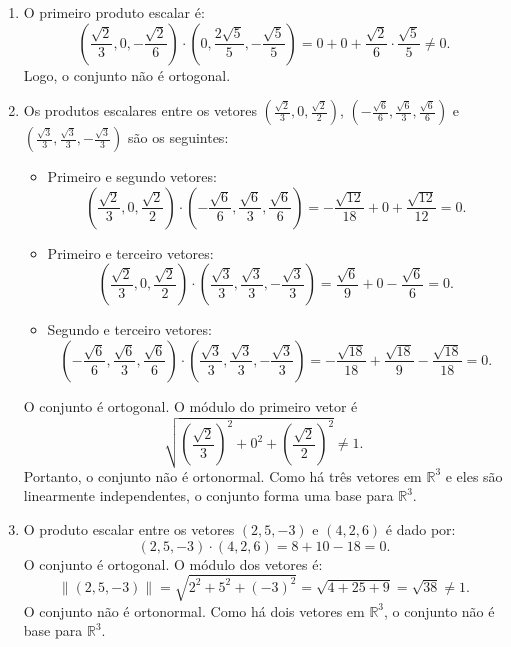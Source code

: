 \begin{resolution}
\begin{enumerate}[label=\alph*)]
    \item O primeiro produto escalar é:
          \[
            \left(\frac{\sqrt{2}}{3}, 0, -\frac{\sqrt{2}}{6}\right) \cdot \left(0, \frac{2\sqrt{5}}{5}, -\frac{\sqrt{5}}{5}\right) = 0 + 0 + \frac{\sqrt{2}}{6} \cdot \frac{\sqrt{5}}{5} \neq 0.
          \]
          Logo, o conjunto não é ortogonal.

    \item Os produtos escalares entre os vetores \(\left(\frac{\sqrt{2}}{3}, 0, \frac{\sqrt{2}}{2}\right)\), \(\left(-\frac{\sqrt{6}}{6}, \frac{\sqrt{6}}{3}, \frac{\sqrt{6}}{6}\right)\) e \(\left(\frac{\sqrt{3}}{3}, \frac{\sqrt{3}}{3}, -\frac{\sqrt{3}}{3}\right)\) são os seguintes:
          \begin{itemize}
            \item Primeiro e segundo vetores:
                  \[
                    \left(\frac{\sqrt{2}}{3}, 0, \frac{\sqrt{2}}{2}\right) \cdot \left(-\frac{\sqrt{6}}{6}, \frac{\sqrt{6}}{3}, \frac{\sqrt{6}}{6}\right) = -\frac{\sqrt{12}}{18} + 0 + \frac{\sqrt{12}}{12} = 0.
                  \]
            \item Primeiro e terceiro vetores:
                  \[
                    \left(\frac{\sqrt{2}}{3}, 0, \frac{\sqrt{2}}{2}\right) \cdot \left(\frac{\sqrt{3}}{3}, \frac{\sqrt{3}}{3}, -\frac{\sqrt{3}}{3}\right) = \frac{\sqrt{6}}{9} + 0 - \frac{\sqrt{6}}{6} = 0.
                  \]
            \item Segundo e terceiro vetores:
                  \[
                    \left(-\frac{\sqrt{6}}{6}, \frac{\sqrt{6}}{3}, \frac{\sqrt{6}}{6}\right) \cdot \left(\frac{\sqrt{3}}{3}, \frac{\sqrt{3}}{3}, -\frac{\sqrt{3}}{3}\right) = -\frac{\sqrt{18}}{18} + \frac{\sqrt{18}}{9} - \frac{\sqrt{18}}{18} = 0.
                  \]
          \end{itemize}
          O conjunto é ortogonal. O módulo do primeiro vetor é
          \[
            \sqrt{\left(\frac{\sqrt{2}}{3}\right)^2 + 0^2 + \left(\frac{\sqrt{2}}{2}\right)^2} \neq 1.
          \]
          Portanto, o conjunto não é ortonormal. Como há três vetores em \(\mathbb{R}^3\) e eles são linearmente independentes, o conjunto forma uma base para \(\mathbb{R}^3\).

    \item O produto escalar entre os vetores \((2, 5, -3)\) e \((4, 2, 6)\) é dado por:
          \[
            (2, 5, -3) \cdot (4, 2, 6) = 8 + 10 - 18 = 0.
          \]
          O conjunto é ortogonal. O módulo dos vetores é:
          \[
            \|(2, 5, -3)\| = \sqrt{2^2 + 5^2 + (-3)^2} = \sqrt{4 + 25 + 9} = \sqrt{38} \neq 1.
          \]
          O conjunto não é ortonormal. Como há dois vetores em \(\mathbb{R}^3\), o conjunto não é base para \(\mathbb{R}^3\).


\end{enumerate}
\end{resolution}
